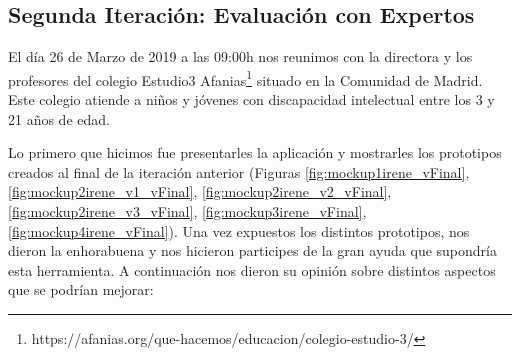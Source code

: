 	 
\subsection{Segunda Iteración: Evaluación con Expertos}
\label{cap:subsec:evaluacionExpertos}

El día 26 de Marzo de 2019 a las 09:00h nos reunimos con la directora y los profesores del colegio Estudio3 Afanias\footnote{https://afanias.org/que-hacemos/educacion/colegio-estudio-3/} situado en la Comunidad de Madrid. Este colegio atiende a niños y jóvenes con discapacidad intelectual entre los 3 y 21 años de edad.

Lo primero que hicimos fue presentarles la aplicación y mostrarles los prototipos creados al final de la iteración anterior (Figuras \ref{fig:mockup1irene_vFinal}, \ref{fig:mockup2irene_v1_vFinal}, \ref{fig:mockup2irene_v2_vFinal}, \ref{fig:mockup2irene_v3_vFinal}, \ref{fig:mockup3irene_vFinal}, \ref{fig:mockup4irene_vFinal}).
Una vez expuestos los distintos prototipos, nos dieron la enhorabuena y nos hicieron participes de la gran ayuda que supondría esta herramienta. A continuación nos dieron su opinión sobre distintos aspectos que se podrían mejorar:

